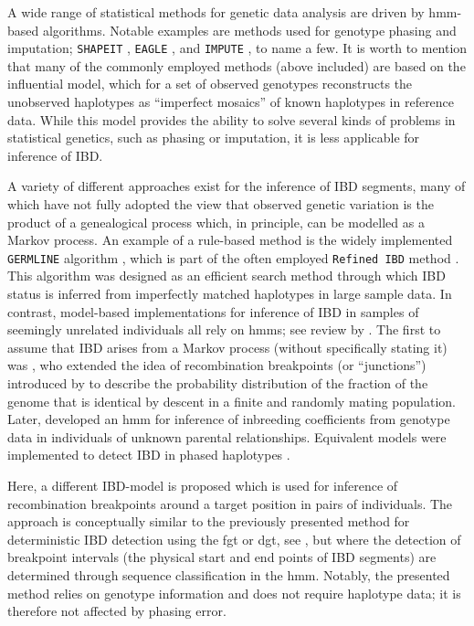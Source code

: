 A wide range of statistical methods for genetic data analysis are driven by \gls{hmm}-based algorithms.
Notable examples are methods used for genotype phasing and imputation; \eg \texttt{SHAPEIT} \citep{Delaneau:2011iu},
\texttt{EAGLE} \citep{loh2016fast,Loh:2016bl}, and
\texttt{IMPUTE} \citep{Howie:2009hq,Howie:2011ji}, to name a few.
It is worth to mention that many of the commonly employed methods (above included) are based on the influential \citet{Li:2003uz} model, which for a set of observed genotypes reconstructs the unobserved haplotypes as ``imperfect mosaics'' of known haplotypes in reference data.
While this model provides the ability to solve several kinds of problems in statistical genetics, such as phasing or imputation, it is less applicable for inference of IBD.

A variety of different approaches exist for the inference of IBD segments, many of which have not fully adopted the view that observed genetic variation is the product of a genealogical process which, in principle, can be modelled as a Markov process.
An example of a rule-based method is the widely implemented \texttt{GERMLINE} algorithm \citep{Gusev:2009hd}, which is part of the often employed \texttt{Refined\,IBD} method \citep{Browning:2013eh}.
This algorithm was designed as an efficient search method through which IBD status is inferred from imperfectly matched haplotypes in large sample data.
In contrast, model-based implementations for inference of IBD in samples of seemingly unrelated individuals all rely on \glspl{hmm}; see review by \citet{Thompson:2013cj}.
The first to assume that IBD arises from a Markov process (without specifically stating it) was \citet{Stam:1980gs}, who extended the idea of recombination breakpoints (or ``junctions'') introduced by \citet{Fisher:1949vh,fisher1954} to describe the probability distribution of the fraction of the genome that is identical by descent in a finite and randomly mating population.
Later, \citet{Leutenegger:2003is} developed an \gls{hmm} for inference of inbreeding coefficients from genotype data in individuals of unknown parental relationships.
Equivalent models were implemented to detect IBD in phased haplotypes \citep[\eg][]{Purcell:2007dg,Browning:2008es}.

Here, a different IBD-model is proposed which is used for inference of recombination breakpoints around a target position in pairs of individuals.
The approach is conceptually similar to the previously presented method for deterministic IBD detection using the \gls{fgt} or \gls{dgt}, see , but where the detection of breakpoint intervals (\ie the physical start and end points of IBD segments) are determined through sequence classification in the \gls{hmm}.
Notably, the presented method relies on genotype information and does not require haplotype data; it is therefore not affected by phasing error.

